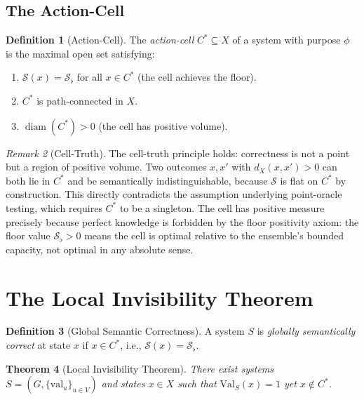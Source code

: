 \documentclass[twocolumn,a4paper,11pt]{article}
\theoremstyle{plain}
\newtheorem{theorem}{Theorem}[section]
\theoremstyle{definition}
\newtheorem{definition}[theorem]{Definition}
\theoremstyle{remark}
\newtheorem{remark}[theorem]{Remark}
\DeclareMathOperator{\diam}{diam}
\newcommand{\Val}{\mathrm{Val}}
\newcommand{\Sflat}{\mathcal{S}_{\flat}}
\begin{document}
\subsection{The Action-Cell}

\begin{definition}[Action-Cell]
\label{def:action-cell}
The \emph{action-cell} $C^* \subseteq X$ of a system with purpose $\phi$
is the maximal open set satisfying:
\begin{enumerate}[leftmargin=*]
  \item $\mathcal{S}(x) = \Sflat$ for all $x \in C^*$ (the cell achieves
        the floor).
  \item $C^*$ is path-connected in $X$.
  \item $\diam(C^*) > 0$ (the cell has positive volume).
\end{enumerate}
\end{definition}

\begin{remark}[Cell-Truth]
The cell-truth principle holds: correctness is not a point but a region of
positive volume. Two outcomes $x, x'$ with $d_X(x,x') > 0$ can both lie
in $C^*$ and be semantically indistinguishable, because $\mathcal{S}$ is
flat on $C^*$ by construction. This directly contradicts the assumption
underlying point-oracle testing, which requires $C^*$ to be a singleton.
The cell has positive measure precisely because perfect knowledge is
forbidden by the floor positivity axiom: the floor value $\Sflat > 0$
means the cell is optimal relative to the ensemble's bounded capacity,
not optimal in any absolute sense.
\end{remark}

\section{The Local Invisibility Theorem}
\label{sec:local-invisibility}

\begin{definition}[Global Semantic Correctness]
\label{def:global-correctness}
A system $S$ is \emph{globally semantically correct} at state $x$ if
$x \in C^*$, i.e., $\mathcal{S}(x) = \Sflat$.
\end{definition}

\begin{theorem}[Local Invisibility Theorem]
\label{thm:local-invisibility}
There exist systems $S = (G, \{\mathrm{val}_u\}_{u \in V})$ and states
$x \in X$ such that $\Val_S(x) = 1$ yet $x \notin C^*$.
\end{theorem}
\end{document}
